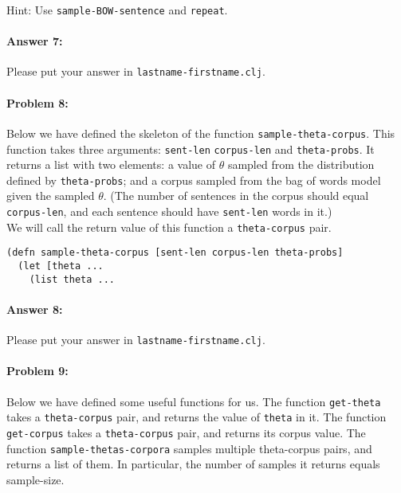 \documentclass[10pt]{article}
\begin{document}
\noindent Hint: Use \texttt{sample-BOW-sentence} and \texttt{repeat}.

\paragraph{Answer 7:} Please put your answer in
\texttt{lastname-firstname.clj}.

\hrulefill
\paragraph{Problem 8:}

Below we have defined the skeleton of the function
\texttt{sample-theta-corpus}. This function takes three arguments:
\texttt{sent-len} \texttt{corpus-len} and \texttt{theta-probs}. It
returns a list with two elements: a value of $\theta$ sampled from the
distribution defined by \texttt{theta-probs}; and a corpus sampled
from the bag of words model given the sampled $\theta$. (The number of
sentences in the corpus should equal \texttt{corpus-len}, and each
sentence should have \texttt{sent-len} words in it.)
\\

\noindent We will call the return value of this function a \texttt{theta-corpus} pair.

\begin{lstlisting}
(defn sample-theta-corpus [sent-len corpus-len theta-probs]
  (let [theta ...
    (list theta ...
\end{lstlisting}

\paragraph{Answer 8:} Please put your answer in
\texttt{lastname-firstname.clj}.

\hrulefill
\paragraph{Problem 9:}

Below we have defined some useful functions for us. The function
\texttt{get-theta} takes a \texttt{theta-corpus} pair, and returns the
value of \texttt{theta} in it. The function \texttt{get-corpus} takes
a \texttt{theta-corpus} pair, and returns its corpus value. The
function \texttt{sample-thetas-corpora} samples multiple theta-corpus
pairs, and returns a list of them. In particular, the number of
samples it returns equals sample-size.
\end{document}
